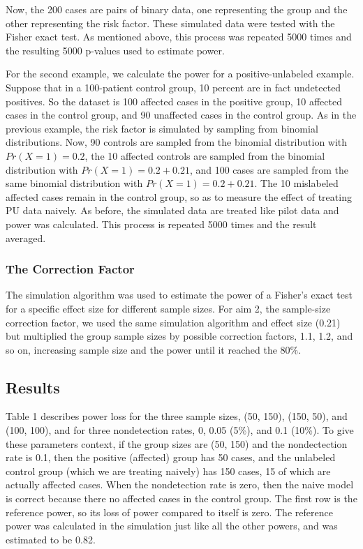 \documentclass[
]{article}
\begin{document}
Now, the 200 cases are pairs of binary data, one representing the group
and the other representing the risk factor. These simulated data were
tested with the Fisher exact test. As mentioned above, this process was
repeated 5000 times and the resulting 5000 p-values used to estimate
power.

For the second example, we calculate the power for a positive-unlabeled
example. Suppose that in a 100-patient control group, 10 percent are in
fact undetected positives. So the dataset is 100 affected cases in the
positive group, 10 affected cases in the control group, and 90
unaffected cases in the control group. As in the previous example, the
risk factor is simulated by sampling from binomial distributions. Now,
90 controls are sampled from the binomial distribution with
\(Pr(X=1) = 0.2\), the 10 affected controls are sampled from the
binomial distribution with \(Pr(X=1) = 0.2+ 0.21\), and 100 cases are
sampled from the same binomial distribution with
\(Pr(X=1) = 0.2 + 0.21\). The 10 mislabeled affected cases remain in the
control group, so as to measure the effect of treating PU data naively.
As before, the simulated data are treated like pilot data and power was
calculated. This process is repeated 5000 times and the result averaged.

\hypertarget{the-correction-factor}{%
\subsubsection{The Correction Factor}\label{the-correction-factor}}

The simulation algorithm was used to estimate the power of a Fisher's
exact test for a specific effect size for different sample sizes. For
aim 2, the sample-size correction factor, we used the same simulation
algorithm and effect size (0.21) but multiplied the group sample sizes
by possible correction factors, 1.1, 1.2, and so on, increasing sample
size and the power until it reached the 80\%.

\pagebreak

\hypertarget{results-1}{%
\subsection{Results}\label{results-1}}

Table 1 describes power loss for the three sample sizes, (50, 150),
(150, 50), and (100, 100), and for three nondetection rates, 0, 0.05
(5\%), and 0.1 (10\%). To give these parameters context, if the group
sizes are (50, 150) and the nondectection rate is 0.1, then the positive
(affected) group has 50 cases, and the unlabeled control group (which we
are treating naively) has 150 cases, 15 of which are actually affected
cases. When the nondetection rate is zero, then the naive model is
correct because there no affected cases in the control group. The first
row is the reference power, so its loss of power compared to itself is
zero. The reference power was calculated in the simulation just like all
the other powers, and was estimated to be 0.82.
\end{document}
